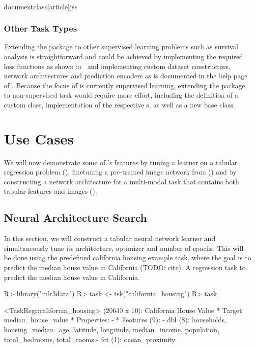 \\documentclass[article]{jss}
\theoremstyle{definition}
\begin{document}
\subsubsection{Other Task Types}

Extending the package to other supervised learning problems such as survival analysis is straightforward and could be achieved by implementing the required loss functions as shown in~ and implementing custom dataset constructors, network architectures and prediction encoders as is documented in the help page of .
Because the focus of  is currently  supervised learning, extending the package to non-supervised task would require more effort, including the definition of a custom  class, implementation of the respective s, as well as a new  base class.

\section{Use Cases}\label{sec:use-cases}

We will now demonstrate some of 's features by tuning a \torch{} learner on a tabular regression problem (), finetuning a pre-trained image network from  () and by constructing a network architecture for a multi-modal task that contains both tabular features and images ().

\subsection{Neural Architecture Search}\label{sec:tuning}

In this section, we will construct a tabular neural network learner and simultaneously tune its architecture, optimizer and number of epochs.
This will be done using the predefined california housing example task, where the goal is to predict the median house value in California (TODO: cite).
A regression task to predict the median house value in California.

\begin{CodeInput}
R> library("mlr3data")
R> task <- tsk("california_housing")
R> task
\end{CodeInput}
\begin{CodeOutput}
<TaskRegr:california_housing> (20640 x 10): California House Value
* Target: median_house_value
* Properties: -
* Features (9):
  - dbl (8): households, housing_median_age, latitude, longitude,
    median_income, population, total_bedrooms, total_rooms
  - fct (1): ocean_proximity
\end{CodeOutput}
\end{document}
